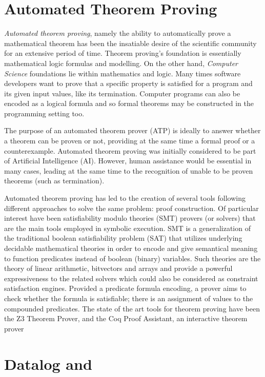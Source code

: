 \section{Automated Theorem Proving}

\textit{Automated theorem proving}, namely the ability to automatically prove a
mathematical theorem has been the insatiable desire of the scientific
community for an extensive period of time. Theorem proving's foundation
is essentially mathematical logic formulas and modelling. On the other hand,
\textit{Computer Science} foundations lie within mathematics and logic.
Many times software developers want to prove that a specific property is satisfied
for a program and its given input values, like its termination. Computer
programs can also be encoded as a logical formula and so formal theorems may be
constructed in the programming setting too.

The purpose of an automated theorem prover (ATP) is ideally to answer whether a
theorem can be proven or not, providing at the same time a formal proof
or a counterexample. Automated theorem proving was initially considered to be
part of Artificial Intelligence (AI). However, human assistance would be essential
in many cases, leading at the same time to the recognition of unable to be proven
theorems (such as termination).

Automated theorem proving has led to the creation of several tools following
different approaches to solve the same problem: proof construction. Of particular
interest have been satisfiability modulo theories (SMT) provers (or solvers)
that are the main tools employed in symbolic execution. SMT is a generalization
of the traditional boolean satisfiability problem (SAT) that utilizes underlying
decidable mathematical theories in order to encode and give semantical
meaning to function predicates instead of boolean (binary) variables. Such theories
are the theory of linear arithmetic, bitvectors and arrays and provide a powerful
expressiveness to the related solvers which could also be considered as
constraint satisfaction engines. Provided a predicate formula encoding, a prover
aims to check whether the formula is satisfiable; there is an assignment of values
to the compounded predicates. The state of the art tools for theorem proving
have been the Z3 Theorem Prover\cite{de2008z3}, and the Coq Proof
Assistant\cite{Coq}, an interactive theorem prover

\section{Datalog and \doop{}}

